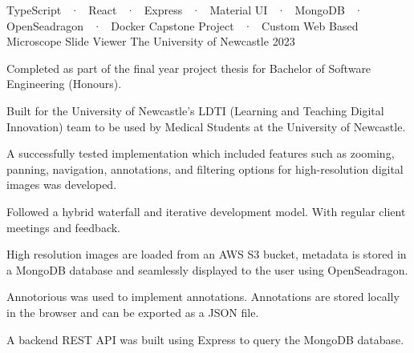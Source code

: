 

\begin{cventries}

  \cventry
  {TypeScript ~·~ React ~·~ Express ~·~ Material UI ~·~ MongoDB ~·~ OpenSeadragon ~·~ Docker } %
  {Capstone Project ~·~ Custom Web Based Microscope Slide Viewer } %
  {The University of Newcastle} %
  {2023} %
  {
    \begin{cvitems} %
      \item {Completed as part of the final year project thesis for Bachelor of Software Engineering (Honours).}
      \item {Built for the University of Newcastle's LDTI (Learning and Teaching Digital Innovation) team to be used by Medical Students at the University of Newcastle.}
      \item {A successfully tested implementation which included features such as zooming, panning, navigation, annotations, and filtering options for high-resolution digital images was developed.}
      \item {Followed a hybrid waterfall and iterative development model. With regular client meetings and feedback.}
      \item {High resolution images are loaded from an AWS S3 bucket, metadata is stored in a MongoDB database and seamlessly displayed to the user using OpenSeadragon.}
      \item {Annotorious was used to implement annotations. Annotations are stored locally in the browser and can be exported as a JSON file.}
      \item {A backend REST API was built using Express to query the MongoDB database.}
    \end{cvitems}
  }


\end{cventries}
